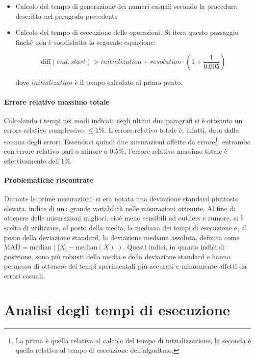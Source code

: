 \documentclass{article}
\begin{document}
	\begin{itemize}
		\item Calcolo del tempo di generazione dei numeri casuali secondo la procedura descritta nel paragrafo precedente
		\item Calcolo del tempo di esecuzione delle operazioni. Si itera questo passaggio finché non è soddisfatta la seguente equazione:
		
			\[
				\text{diff}\left(end, start\right) > initialization + resolution \cdot \left(1+\frac{1}{0.005}\right)  
			\]
			
			dove $initialization$ è il tempo calcolato al primo punto.
	\end{itemize}
	
	\newpage
	
	\paragraph{Errore relativo massimo totale}
	Calcolando i tempi nei modi indicati negli ultimi due paragrafi si è ottenuto un errore relativo complessivo $\leq1\%$. L'errore relativo totale è, infatti, dato dalla somma degli errori. Essendoci quindi due misurazioni affette da errore\footnote{La prima è quella relativa al calcolo del tempo di inizializzazione, la seconda è quella relativa al tempo di esecuzione dell'algoritmo.}, entrambe con errore relativo pari o minore a $0.5\%$, l'errore relativo massimo totale è effettivamente dell'$1\%$.
	
	\paragraph{Problematiche riscontrate}
	Durante le prime misurazioni, si era notata una deviazione standard piuttosto elevata, indice di una grande variabilità nelle misurazioni ottenute. Al fine di ottenere delle misurazioni migliori, cioè meno sensibili ad outliers e rumore, si è scelto di utilizzare, al posto della media, la mediana dei tempi di esecuzione e, al posto della deviazione standard, la deviazione mediana assoluta, definita come $\textrm{MAD}=\textrm{median}\left(\mathopen|X_{i}-\textrm{median}\left(X\right)\mathclose|\right)$. Questi indici, in quanto indici di posizione, sono più robusti della media e della deviazione standard e hanno permesso di ottenere dei tempi sperimentali più accurati e minormente affetti da errori casuali.
	
	\newpage
	\section{Analisi degli tempi di esecuzione}
	
\end{document}
